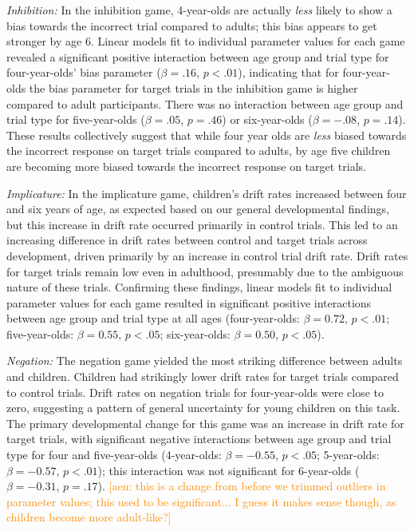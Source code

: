 \documentclass[10pt,letterpaper]{article}
\newcommand{\aen}[1]{\textcolor{DarkOrange}{[aen: #1]}}
\begin{document}
\emph{Inhibition:} In the inhibition game, 4-year-olds are actually \emph{less} likely to show a bias towards the incorrect trial compared to adults; this bias appears to get stronger by age 6.  Linear models fit to individual parameter values for each game revealed a significant positive interaction between age group and trial type for four-year-olds' bias parameter ($\beta = .16$, $p< .01$), indicating that for four-year-olds the bias parameter for target trials in the inhibition game is higher compared to adult participants.  There was no interaction between age group and trial type for five-year-olds ($\beta = .05$, $p = .46$) or six-year-olds ($\beta = -.08$, $p = .14$).  These results collectively suggest that while four year olds are \emph{less} biased towards the incorrect response on target trials compared to adults, by age five children are becoming more biased towards the incorrect response on target trials.  

\emph{Implicature:} In the implicature game, children's drift rates increased between four and six years of age, as expected based on our general developmental findings, but this increase in drift rate occurred primarily in control trials.  This led to an increasing difference in drift rates between control and target trials across development, driven primarily by an increase in control trial drift rate.  Drift rates for target trials remain low even in adulthood, presumably due to the ambiguous nature of these trials.  Confirming these findings, linear models fit to individual parameter values for each game resulted in significant positive interactions between age group and trial type at all ages (four-year-olds: $\beta = 0.72$, $p <.01$; five-year-olds: $\beta = 0.55$, $p <.05$; six-year-olds: $\beta = 0.50$, $p <.05$).

\emph{Negation:}  The negation game yielded the most striking difference between adults and children.  Children had strikingly lower drift rates for target trials compared to control trials.  Drift rates on negation trials for four-year-olds were close to zero, suggesting a pattern of general uncertainty for young children on this task.  The primary developmental change for this game was an increase in drift rate for target trials, with significant negative interactions between age group and trial type for four and five-year-olds (4-year-olds: $\beta = -0.55$, $p <.05$; 5-year-olds: $\beta = -0.57$, $p <.01$); this interaction was not significant for 6-year-olds ($\beta = -0.31$, $p = .17$).  \aen{this is a change from before we trimmed outliers in parameter values; this used to be significant... I guess it makes sense though, as children become more adult-like?}
\end{document}
